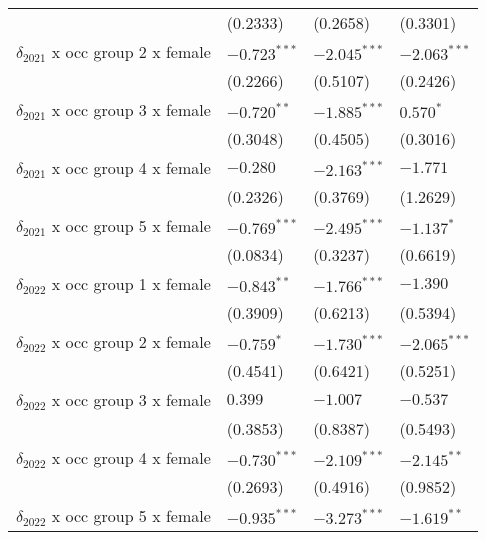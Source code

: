\begin{tabular}{llll}
                                       &           (0.2333) &           (0.2658) &           (0.3301) \\
$\delta_{2021}$ x occ group 2 x female &     $-0.723^{***}$ &     $-2.045^{***}$ &     $-2.063^{***}$ \\
                                       &           (0.2266) &           (0.5107) &           (0.2426) \\
$\delta_{2021}$ x occ group 3 x female &      $-0.720^{**}$ &     $-1.885^{***}$ &          $0.570^*$ \\
                                       &           (0.3048) &           (0.4505) &           (0.3016) \\
$\delta_{2021}$ x occ group 4 x female &           $-0.280$ &     $-2.163^{***}$ &           $-1.771$ \\
                                       &           (0.2326) &           (0.3769) &           (1.2629) \\
$\delta_{2021}$ x occ group 5 x female &     $-0.769^{***}$ &     $-2.495^{***}$ &         $-1.137^*$ \\
                                       &           (0.0834) &           (0.3237) &           (0.6619) \\
$\delta_{2022}$ x occ group 1 x female &      $-0.843^{**}$ &     $-1.766^{***}$ &           $-1.390$ \\
                                       &           (0.3909) &           (0.6213) &           (0.5394) \\
$\delta_{2022}$ x occ group 2 x female &         $-0.759^*$ &     $-1.730^{***}$ &     $-2.065^{***}$ \\
                                       &           (0.4541) &           (0.6421) &           (0.5251) \\
$\delta_{2022}$ x occ group 3 x female &            $0.399$ &           $-1.007$ &           $-0.537$ \\
                                       &           (0.3853) &           (0.8387) &           (0.5493) \\
$\delta_{2022}$ x occ group 4 x female &     $-0.730^{***}$ &     $-2.109^{***}$ &      $-2.145^{**}$ \\
                                       &           (0.2693) &           (0.4916) &           (0.9852) \\
$\delta_{2022}$ x occ group 5 x female &     $-0.935^{***}$ &     $-3.273^{***}$ &      $-1.619^{**}$ \\

\end{tabular}
